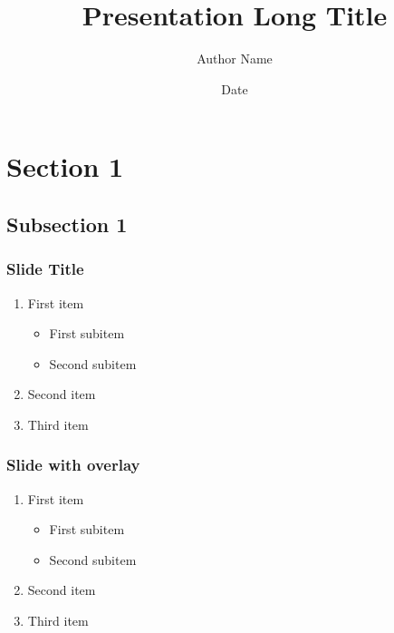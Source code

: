 \documentclass[hyperref={pdfpagelabels=false}]{beamer}
\title{Presentation Long Title}
\institute{E-mail\\ \vspace{15pt}Institution Name}
\author{Author Name}
\date{Date}
\begin{document}
\maketitle
{}




\section{Section 1}
\subsection{Subsection 1}
\frame
{
  \frametitle{Slide Title}
  \vspace{25pt}
    \begin{enumerate}
     \item First item  
     \begin{itemize}
      \item First subitem
      \item Second subitem
     \end{itemize}
     \item Second item
     \item Third item
    \end{enumerate}
}
\frame
{
  \frametitle{Slide with overlay}
  \vspace{25pt}
    \begin{enumerate}
     \item First item \pause
     \begin{itemize}
      \item First subitem
      \item Second subitem
     \end{itemize}
     \item Second item \pause
     \item Third item
    \end{enumerate}
}
\end{document}
